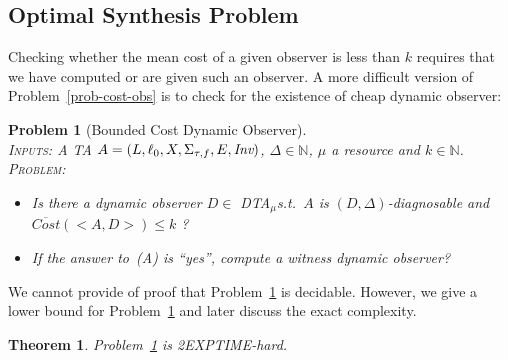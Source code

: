 \documentclass[letterpaper,10pt,conference]{ieeeconf}  \IEEEoverridecommandlockouts                              \overrideIEEEmargins
\def\st{{s.t.}~}
\newtheorem{prob}{Problem}  \newtheorem{definition}{Definition}
\newtheorem{theorem}{Theorem}
\newcommand{\setN}{\mathbb N}
\def\Cost{\textit{Cost}}
\def\MeanCost{\textit{$\overline{\Cost}$}}
\def\tauac{\tau}
\def\dtamu{DTA$_\mu$\xspace}
\begin{document}
\subsection{Optimal Synthesis Problem}
Checking whether the mean cost of a given observer is less than $k$
requires that we have computed or are given such an observer.  A more
difficult version of Problem~\ref{prob-cost-obs} is to check for the
existence of cheap dynamic observer:
\begin{prob}[Bounded Cost Dynamic Observer] \label{prob-bounded-cost} \mbox{} \\
  \textsc{Inputs:} A TA $A=(L,\ell_0,X,\Sigma_{\tauac,f},E,\inv)$,
  $\Delta \in \setN$,
  $\mu$ a resource and $k \in \setN$. \\
  \textsc{Problem:}
  \begin{itemize}
  \item[(A)] Is there a dynamic observer $D \in$ \dtamu \st $A$ is
    $(D,\Delta)$-diagnosable and $\MeanCost(<\!A,D\!>) \leq k$ ?
  \item[(B)] If the answer to~(A) is ``yes'', compute a witness
    dynamic observer?
  \end{itemize}
\end{prob}
We cannot provide of proof that Problem~\ref{prob-bounded-cost} is
decidable.  However, we give a lower bound for
Problem~\ref{prob-bounded-cost} and later discuss the exact
complexity.
\begin{theorem}
  Problem~\ref{prob-bounded-cost} is 2EXPTIME-hard.
\end{theorem}
\end{document}
